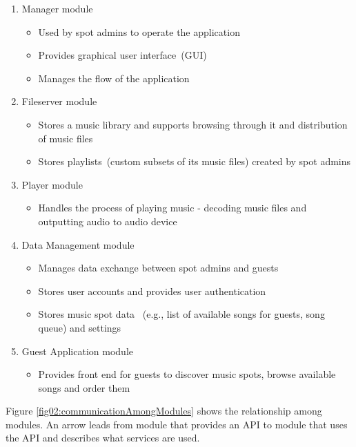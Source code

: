 \begin{enumerate}
    \item Manager module
        \begin{itemize}
            \item Used by spot admins to operate the application
            \item Provides graphical user interface~(GUI)
            \item Manages the flow of the application
        \end{itemize}
    \item Fileserver module
        \begin{itemize}
            \item Stores a music library and supports browsing through it and distribution of music files
            \item Stores playlists~(custom subsets of its music files) created by spot admins
        \end{itemize}
    \item Player module
        \begin{itemize}
            \item Handles the process of playing music - decoding music files and outputting audio to audio device
        \end{itemize}
    \item Data Management module
        \begin{itemize}
            \item Manages data exchange between spot admins and guests
            \item Stores user accounts and provides user authentication
            \item Stores music spot data ~(e.g., list of available songs for guests, song queue) and settings
        \end{itemize}
    \item Guest Application module
        \begin{itemize}
            \item Provides front end for guests to discover music spots, browse available songs and order them
        \end{itemize}
\end{enumerate}

\par
Figure \ref{fig02:communicationAmongModules} shows the relationship among modules. An arrow leads from module that provides an API to module that uses the API and describes what services are used.

